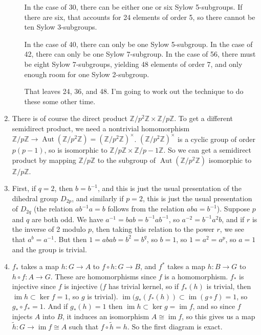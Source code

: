 \documentclass{article}
\newcommand\ZZ{\mathbb Z}
\newcommand\Zm[1]{\ZZ/#1\ZZ}
\DeclareMathOperator\Aut{Aut}
\DeclareMathOperator\im{im}
\begin{document}
\begin{enumerate}
\begin{enumerate}
            In the case of 30, there can be either one or six Sylow 5-subgroups.
            If there are six, that accounts for 24 elements of order 5, so there
            cannot be ten Sylow 3-subgroups.

            In the case of 40, there can only be one Sylow 5-subgroup. In the
            case of 42, there can only be one Sylow 7-subgroup. In the case of
            56, there must be eight Sylow 7-subgroups, yielding 48 elements of
            order 7, and only enough room for one Sylow 2-subgroup.

            That leaves 24, 36, and 48. I'm going to work out the technique to
            do these some other time.

      \end{enumerate}

   \item There is of course the direct product $\Zm{p^2} \times \Zm{p}$. To get
      a different semidirect product, we need a nontrivial homomorphism $\Zm p
      \to \Aut(\Zm{p^2}) = (\Zm{p^2})^\times$. $(\Zm{p^2})^\times$ is a cyclic
      group of order $p(p-1)$, so is isomorphic to $\Zm{p} \times \Zm{p-1}$. So
      we can get a semidirect product by mapping $\Zm{p}$ to the subgroup of
      $\Aut(\Zm{p^2})$ isomorphic to $\Zm{p}$.

   \item First, if $q=2$, then $b=b^{-1}$, and this is just the usual
      presentation of the dihedral group $D_{2p}$, and similarly if $p=2$, this
      is just the usual presentation of $D_{2q}$ (the relation $ab^{-1}a = b$
      follows from the relation $aba = b^{-1}$). Suppose $p$ and $q$ are both
      odd.  We have $a^{-1} = bab = b^{-1}ab^{-1}$, so $a^{-2} = b^{-1}a^2b$,
      and if $r$ is the inverse of 2 modulo $p$, then taking this relation to
      the power $r$, we see that $a^b = a^{-1}$. But then $1 = abab = b^2 =
      b^q$, so $b=1$, so $1 = a^2 = a^p$, so $a=1$ and the group is trivial.

   \item $f_*$ takes a map $h : G \to A$ to $f \circ h : G \to B$, and $f^*$
      takes a map $h : B \to G$ to $h \circ f : A \to G$. These are
      homomorphisms since $f$ is a homomorphism. $f_*$ is injective since $f$ is
      injective ($f$ has trivial kernel, so if $f_*(h)$ is trivial, then $\im h
      \subset \ker f = 1$, so $g$ is trivial). $\im(g_*(f_*(h)) \subset \im(g
      \circ f) = 1$, so $g_* \circ f_* = 1$. And if $g_*(h) = 1$ then $\im h
      \subset \ker g = \im f$, and so since $f$ injects $A$ into $B$, it induces
      an isomorphism $A \cong \im f$, so this gives us a map $\tilde h : G \to
      \im f \cong A$ such that $f \circ \tilde h = h$. So the first diagram is
      exact.


\end{enumerate}
\end{document}
